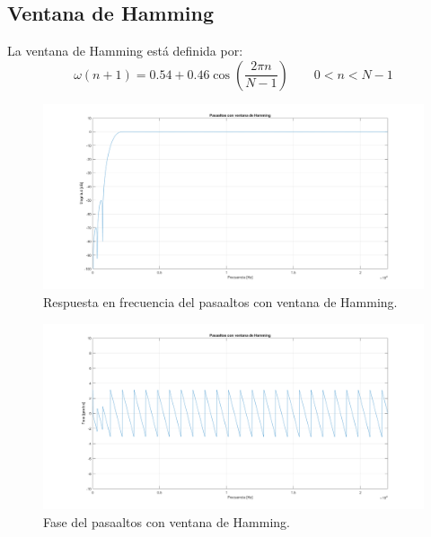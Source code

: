 \subsection{Ventana de Hamming}
La ventana de Hamming está definida por:
\begin{equation}
    \omega (n+1)=0.54+0.46\cos\left(\frac{2\pi n}{N-1} \right)  \qquad  0<n<N-1
\end{equation}
\begin{figure}[H]
  \includegraphics[scale=.35]{./images/1/hammingmod.png}
  \caption{Respuesta en frecuencia del pasaaltos con ventana de Hamming.}
\end{figure}
\begin{figure}[H]
  \includegraphics[scale=.35]{./images/1/hammingfase.png}
  \caption{Fase del pasaaltos con ventana de Hamming.}
\end{figure}
